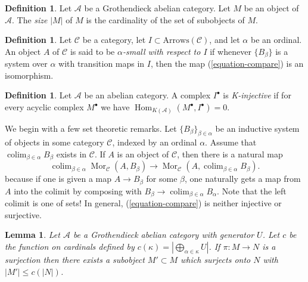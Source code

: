 \documentclass{amsart}
\theoremstyle{plain}
\newtheorem{lemma}[subsection]{Lemma}
\theoremstyle{definition}
\newtheorem{definition}[subsection]{Definition}
\theoremstyle{remark}
\numberwithin{equation}{subsection}
\def\colim{\mathop{\mathrm{colim}}\nolimits}
\def\Hom{\mathop{\mathrm{Hom}}\nolimits}
\def\Mor{\mathop{\mathrm{Mor}}\nolimits}
\begin{document}
\begin{definition}
\label{definition-size}
Let $\mathcal{A}$ be a Grothendieck abelian category.
Let $M$ be an object of $\mathcal{A}$.
The {\it size} $|M|$ of $M$ is the cardinality of the set of subobjects
of $M$.
\end{definition}

\begin{definition}
\label{definition-small}
Let $\mathcal{C}$ be a category, let $I \subset \text{Arrows}(\mathcal{C})$,
and let $\alpha$ be an ordinal. An object $A$ of $\mathcal{C}$ is said to
be {\it $\alpha$-small with respect to $I$} if whenever $\{B_\beta\}$ is
a system over $\alpha$ with transition maps in $I$, then
the map (\ref{equation-compare}) is an isomorphism.
\end{definition}

\begin{definition}
\label{derived-definition-K-injective}
Let $\mathcal{A}$ be an abelian category. A complex $I^\bullet$
is {\it K-injective} if for every acyclic complex $M^\bullet$ we
have $\Hom_{K(\mathcal{A})}(M^\bullet, I^\bullet) = 0$.
\end{definition}

\medskip\noindent
We begin with a few set theoretic remarks.
Let $\{B_{\beta}\}_{\beta \in \alpha}$ be an inductive system of
objects in some category $\mathcal{C}$, indexed by
an ordinal $\alpha$. Assume that $\colim_{\beta \in \alpha} B_\beta$
exists in $\mathcal{C}$. If $A$ is an object of $\mathcal{C}$, then there is a
natural map
\begin{equation}
\label{equation-compare}
\colim_{\beta \in \alpha} \Mor_\mathcal{C}(A, B_\beta)
\longrightarrow
\Mor_\mathcal{C}(A, \colim_{\beta \in \alpha} B_\beta).
\end{equation}
because if one is given a map $A \to B_\beta$ for some $\beta$, one
naturally gets a map from $A$  into the colimit by composing with
$B_\beta \to \colim_{\beta \in \alpha} B_\alpha$.
Note that the left colimit is one of sets! In general, (\ref{equation-compare})
is neither injective or surjective.

\begin{lemma}
\label{lemma-surjection-bounded-size}
Let $\mathcal{A}$ be a Grothendieck abelian category with generator $U$.
Let $c$ be the function on cardinals defined by
$c(\kappa) = |\bigoplus_{\alpha \in \kappa} U|$. If $\pi : M \to N$ is a
surjection then there exists a subobject $M' \subset M$ which surjects
onto $N$ with $|M'| \leq c(|N|)$.
\end{lemma}
\end{document}
